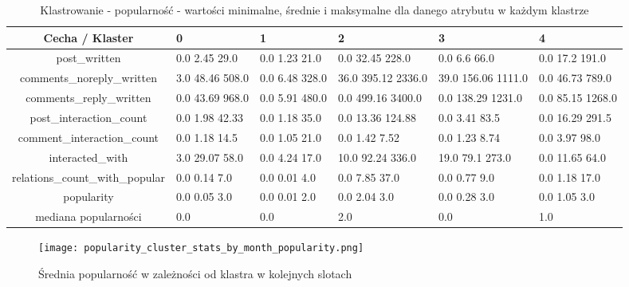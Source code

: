 \documentclass[polish,12pt]{aghthesis}
\begin{document}
\begin{table}[ht]
    \centering
  \begin{center}
\begin{tabular}{ |c|M{1,1cm}|M{1,1cm}|M{1,1cm}|M{1,1cm}|M{1,1cm}| } 
\hline
 Cecha / Klaster & 0 & 1 & 2 & 3 & 4 \\ [0.5ex] 
 \hline
post\_written & 0.0 2.45 29.0 & 0.0 1.23 21.0 & 0.0 32.45 228.0 & 0.0 6.6 66.0 & 0.0 17.2 191.0 \\ 
\hline
comments\_noreply\_written & 3.0 48.46 508.0 & 0.0 6.48 328.0 & 36.0 395.12 2336.0 & 39.0 156.06 1111.0 & 0.0 46.73 789.0 \\ 
\hline
comments\_reply\_written & 0.0 43.69 968.0 & 0.0 5.91 480.0 & 0.0 499.16 3400.0 & 0.0 138.29 1231.0 & 0.0 85.15 1268.0 \\ 
\hline
post\_interaction\_count & 0.0 1.98 42.33 & 0.0 1.18 35.0 & 0.0 13.36 124.88 & 0.0 3.41 83.5 & 0.0 16.29 291.5 \\ 
\hline
comment\_interaction\_count & 0.0 1.18 14.5 & 0.0 1.05 21.0 & 0.0 1.42 7.52 & 0.0 1.23 8.74 & 0.0 3.97 98.0 \\ 
\hline
interacted\_with & 3.0 29.07 58.0 & 0.0 4.24 17.0 & 10.0 92.24 336.0 & 19.0 79.1 273.0 & 0.0 11.65 64.0 \\ 
\hline
relations\_count\_with\_popular & 0.0 0.14 7.0 & 0.0 0.01 4.0 & 0.0 7.85 37.0 & 0.0 0.77 9.0 & 0.0 1.18 17.0 \\ 
\hline
\hline
popularity & 0.0 0.05 3.0 & 0.0 0.01 2.0 & 0.0 2.04 3.0 & 0.0 0.28 3.0 & 0.0 1.05 3.0 \\ 
\hline
\hline
 mediana popularności & 0.0 & 0.0 & 2.0 & 0.0 & 1.0 \\
\hline
\end{tabular}
\end{center}
\caption{Klastrowanie - popularność - wartości minimalne, średnie i maksymalne dla danego atrybutu w każdym klastrze}
\label{tab:p}
\end{table}


\FloatBarrier

\begin{figure}[ht]
    \centering
    \texttt{[image: popularity\_cluster\_stats\_by\_month\_popularity.png]}
    \caption[Średnia popularność w zależności od klastra]{Średnia popularność w zależności od klastra w kolejnych slotach}
    \label{fig:popularity_cluster_stats}
\end{figure}
\end{document}
